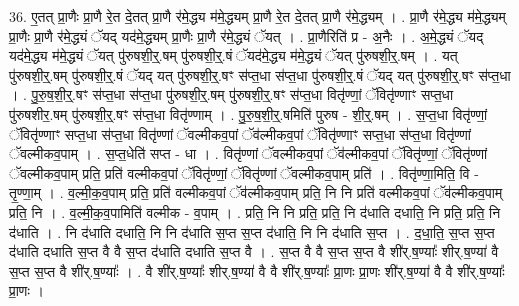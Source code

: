 \documentclass[17pt]{extarticle}
\begin{document}
36. ए॒तत् प्रा॒णैः प्रा॒णै रे॒त दे॒तत् प्रा॒णै र॑मे॒द्ध्य म॑मे॒द्ध्यम् प्रा॒णै रे॒त दे॒तत् प्रा॒णै र॑मे॒द्ध्यम् । . प्रा॒णै र॑मे॒द्ध्य म॑मे॒द्ध्यम् प्रा॒णैः प्रा॒णै र॑मे॒द्ध्यं ॅयद् यद॑मे॒द्ध्यम् प्रा॒णैः प्रा॒णै र॑मे॒द्ध्यं ॅयत् । . प्रा॒णैरिति॑ प्र - अ॒नैः । . अ॒मे॒द्ध्यं ॅयद् यद॑मे॒द्ध्य म॑मे॒द्ध्यं ॅयत् पु॑रुषशी॒र्॒.षम् पु॑रुषशी॒र्॒.षं ॅयद॑मे॒द्ध्य म॑मे॒द्ध्यं ॅयत् पु॑रुषशी॒र्॒.षम् । . यत् पु॑रुषशी॒र्॒.षम् पु॑रुषशी॒र्॒.षं ॅयद् यत् पु॑रुषशी॒र्॒.षꣳ स॑प्त॒धा स॑प्त॒धा पु॑रुषशी॒र्॒.षं ॅयद् यत् पु॑रुषशी॒र्॒.षꣳ स॑प्त॒धा । . पु॒रु॒ष॒शी॒र्॒.षꣳ स॑प्त॒धा स॑प्त॒धा पु॑रुषशी॒र्॒.षम् पु॑रुषशी॒र्॒.षꣳ स॑प्त॒धा वितृ॑ण्णां॒ ॅवितृ॑ण्णाꣳ सप्त॒धा पु॑रुषशीर॒.षम् पु॑रुषशी॒र्॒.षꣳ स॑प्त॒धा वितृ॑ण्णाम् । . पु॒रु॒ष॒शी॒र्॒.षमिति॑ पुरुष - शी॒र्॒.षम् । . स॒प्त॒धा वितृ॑ण्णां॒ ॅवितृ॑ण्णाꣳ सप्त॒धा स॑प्त॒धा वितृ॑ण्णां ॅवल्मीकव॒पां ॅव॑ल्मीकव॒पां ॅवितृ॑ण्णाꣳ सप्त॒धा स॑प्त॒धा वितृ॑ण्णां ॅवल्मीकव॒पाम् । . स॒प्त॒धेति॑ सप्त - धा । . वितृ॑ण्णां ॅवल्मीकव॒पां ॅव॑ल्मीकव॒पां ॅवितृ॑ण्णां॒ ॅवितृ॑ण्णां ॅवल्मीकव॒पाम् प्रति॒ प्रति॑ वल्मीकव॒पां ॅवितृ॑ण्णां॒ ॅवितृ॑ण्णां ॅवल्मीकव॒पाम् प्रति॑ । . वितृ॑ण्णा॒मिति॒ वि - तृ॒ण्णा॒म् । . व॒ल्मी॒क॒व॒पाम् प्रति॒ प्रति॑ वल्मीकव॒पां ॅव॑ल्मीकव॒पाम् प्रति॒ नि नि प्रति॑ वल्मीकव॒पां ॅव॑ल्मीकव॒पाम् प्रति॒ नि । . व॒ल्मी॒क॒व॒पामिति॑ वल्मीक - व॒पाम् । . प्रति॒ नि नि प्रति॒ प्रति॒ नि द॑धाति दधाति॒ नि प्रति॒ प्रति॒ नि द॑धाति । . नि द॑धाति दधाति॒ नि नि द॑धाति स॒प्त स॒प्त द॑धाति॒ नि नि द॑धाति स॒प्त । . द॒धा॒ति॒ स॒प्त स॒प्त द॑धाति दधाति स॒प्त वै वै स॒प्त द॑धाति दधाति स॒प्त वै । . स॒प्त वै वै स॒प्त स॒प्त वै शी॑र्.ष॒ण्याः᳚ शीर्.ष॒ण्या॑ वै स॒प्त स॒प्त वै शी॑र्.ष॒ण्याः᳚ । . वै शी॑र्.ष॒ण्याः᳚ शीर्.ष॒ण्या॑ वै वै शी॑र्.ष॒ण्याः᳚ प्रा॒णः प्रा॒णः शी॑र्.ष॒ण्या॑ वै वै शी॑र्.ष॒ण्याः᳚ प्रा॒णः । \newline
\end{document}
